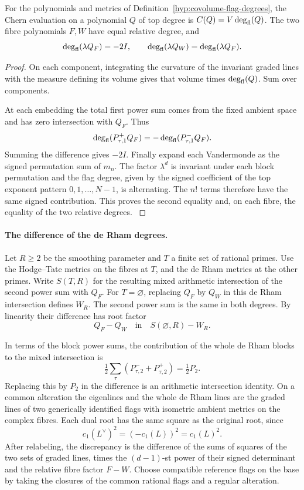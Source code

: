 \begin{lemma}\label{lem:flag-point-degrees}
For the polynomials and metrics of Definition~\ref{hyp:covolume-flag-degrees},
the Chern evaluation on a polynomial \(Q\) of top degree is
\(C(Q)=V\deg_{\rm fl}(Q)\). The two fibre polynomials \(F,W\)
have equal relative degree, and
\begin{equation}\label{eq:flag-test-degrees}
 \deg_{\rm fl}(\lambda Q_F)=-2I,\qquad
 \deg_{\rm fl}(\lambda Q_W)=\deg_{\rm fl}(\lambda Q_F).
\end{equation}
\end{lemma}
\begin{proof}
On each component, integrating the curvature of the invariant
graded lines with the measure defining its volume gives that volume
times \(\deg_{\rm fl}(Q)\). Sum over components.

At each embedding the total first power sum comes from the fixed
ambient space and has zero intersection with \(Q_F\). Thus
\[
 \deg_{\rm fl}(P^+_{\tau,1}Q_F)=-\deg_{\rm fl}(P^-_{\tau,1}Q_F).
\]
Summing the difference gives \(-2I\). Finally expand each
Vandermonde as the signed permutation sum of \(m_n\).
The factor \(\lambda^d\) is invariant under each block permutation
and the flag degree, given by the signed coefficient of the top
exponent pattern \(0,1,\ldots,N-1\), is alternating. The \(n!\)
terms therefore have the same signed contribution. This proves the
second equality and, on each fibre, the equality of the two relative
degrees. \label{cor:covolume-flag-test-2}
\end{proof}

\paragraph{The difference of the de Rham degrees.}
Let \(R\ge2\) be the smoothing parameter and \(T\) a finite set of rational primes. Use the Hodge--Tate metrics on the fibres at \(T\), and the de Rham metrics at the other primes. Write \(S(T,R)\) for the resulting mixed arithmetic intersection of the second power sum with \(Q_F\). For \(T=\varnothing\), replacing \(Q_F\) by \(Q_W\) in this de Rham intersection defines \(W_R\). The second power sum is the same in both degrees. By linearity their difference has root factor
\[
 Q_F-Q_W\quad\text{in}\quad S(\varnothing,R)-W_R.
\]


In terms of the block power sums, the contribution of the whole de Rham blocks to the mixed intersection is
\[
 \tfrac12\sum_\tau(P^-_{\tau,2}+P^+_{\tau,2})=\tfrac12P_2.
\]
Replacing this by
\(P_2\) in the difference is an arithmetic intersection
identity. On a common alteration the eigenlines and the
whole de Rham lines are the graded lines of two
generically identified flags with isometric
ambient metrics on the complex fibres. Each dual root has the same square as the original root, since
\[
 c_1(L^\vee)^2=(-c_1(L))^2=c_1(L)^2.
\]
After
relabeling, the discrepancy is the difference of the
sums of squares of the two sets of graded lines, times
the \((d-1)\)-st power of their signed determinant and
the relative fibre factor \(F-W\). Choose compatible
reference flags on the base by taking the closures of
the common rational flags and a regular alteration.

